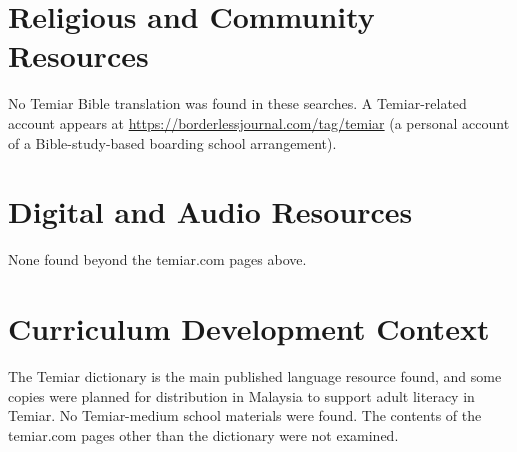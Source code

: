 \documentclass[12pt]{article}
\begin{document}
\section{Religious and Community Resources}
No Temiar Bible translation was found in these searches. A Temiar-related account appears at \url{https://borderlessjournal.com/tag/temiar} (a personal account of a Bible-study-based boarding school arrangement).

\section{Digital and Audio Resources}
None found beyond the temiar.com pages above.

\section{Curriculum Development Context}
The Temiar dictionary is the main published language resource found, and some copies were planned for distribution in Malaysia to support adult literacy in Temiar. No Temiar-medium school materials were found. The contents of the temiar.com pages other than the dictionary were not examined.
\end{document}
